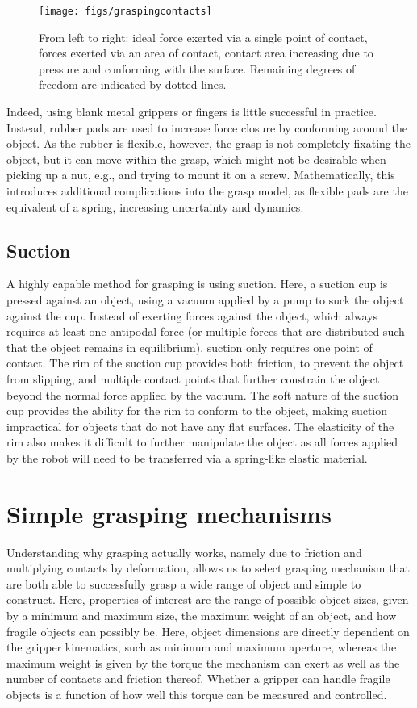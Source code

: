 \begin{figure}
\texttt{[image: figs/graspingcontacts]}
\caption{From left to right: ideal force exerted via a single point of contact, forces exerted via an area of contact, contact area increasing due to pressure and conforming with the surface. Remaining degrees of freedom are indicated by dotted lines.\label{fig:contactarea}}
\end{figure}

Indeed, using blank metal grippers or fingers is little successful in practice. Instead, rubber pads are used to increase force closure by conforming around the object. As the rubber is flexible, however, the grasp is not completely fixating the object, but it can move within the grasp, which might not be desirable when picking up a nut, e.g., and trying to mount it on a screw. Mathematically, this introduces additional complications into the grasp model, as flexible pads are the equivalent of a spring, increasing uncertainty and dynamics. 

\subsection{Suction}

A highly capable method for grasping is using suction. Here, a suction cup is pressed against an object, using a vacuum applied by a pump to suck the object against the cup. Instead of exerting forces against the object, which always requires at least one antipodal force (or multiple forces that are distributed such that the object remains in equilibrium), suction only requires one point of contact. The rim of the suction cup provides both friction, to prevent the object from slipping, and multiple contact points that further constrain the object beyond the normal force applied by the vacuum. The soft nature of the suction cup provides the ability for the rim to conform to the object, making suction impractical for objects that do not have any flat surfaces. The elasticity of the rim also makes it difficult to further manipulate the object as all forces applied by the robot will need to be transferred via a spring-like elastic material.

\section{Simple grasping mechanisms}
Understanding why grasping actually works, namely due to friction and multiplying contacts by deformation, allows us to select grasping mechanism that are both able to successfully grasp a wide range of object and simple to construct. Here, properties of interest are the range of possible object sizes, given by a minimum and maximum size, the maximum weight of an object, and how fragile objects can possibly be. Here, object dimensions are directly dependent on the gripper kinematics, such as minimum and maximum aperture, whereas the maximum weight is given by the torque the mechanism can exert as well as the number of contacts and friction thereof. Whether a gripper can handle fragile objects is a function of how well this torque can be measured and controlled. 

